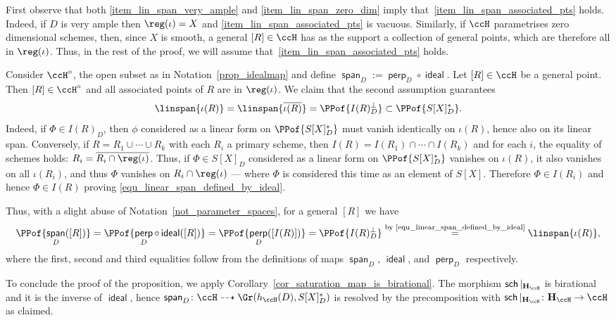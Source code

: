 \documentclass[12pt,a4paper]{article}
\DeclareMathOperator{\sch}{\mathsf {sch}}
\DeclareMathOperator{\spanmap}{\mathsf {span}}
\DeclareMathOperator{\idealmap}{\mathsf {ideal}}
\DeclareMathOperator{\perpmap}{\mathsf {perp}}
\begin{document}
\begin{prf}
  First observe that both \ref{item_lin_span_very_ample} and \ref{item_lin_span_zero_dim} imply
  that~\ref{item_lin_span_associated_pts} holds.
   Indeed,   if $D$ is very ample then $\reg(\iota)=X$
     and \ref{item_lin_span_associated_pts}     is vacuous.
     Similarly,     if $\ccH$ parametrises zero dimensional schemes, then, since $X$ is smooth,
     a general $[R]\in \ccH$ has as the support a collection of general points, which are therefore all in $\reg(\iota)$.
   Thus, in the rest of the proof, we will assume that~\ref{item_lin_span_associated_pts} holds.

   Consider $\ccH^{\circ}$, the open subset as in Notation~\ref{prop_idealmap} and define
   $\spanmap_D:= \perpmap_D \circ \idealmap$.
   Let $[R]\in \ccH$ be a general point. Then
   $[R]\in \ccH^{\circ}$ and all associated points of $R$ are in $\reg(\iota)$.
   We claim that the second assumption guarantees 
   \begin{equation}\label{equ_linear_span_defined_by_ideal}
      \linspan{\iota(R)}
     =\linspan{\overline{\iota(R)}}
     =\PPof{I(R)_D^{\perp}} \subset \PPof{S[X]_D^{*}}.
   \end{equation}
   Indeed, if $\Phi \in I(R)_D$, then $\phi$ considered as a linear form on $\PPof{S[X]_D^{*}}$  must
   vanish identically on $\iota(R)$, hence also on its linear span.
   Conversely, if $R= R_1 \cup \dotsb \cup R_k$ with each $R_i$ a primary scheme,
     then $I(R) =I(R_1)\cap \dotsb \cap I(R_k)$
     and for each $i$, the equality of schemes holds: $R_i=\overline{R_i\cap \reg(\iota)}$.
   Thus, if $\Phi \in S[X]_D$ considered as a linear form on $\PPof{S[X]_D^{*}}$ vanishes on $\iota(R)$,
    it also vanishes on all  $\iota(R_i)$, and thus $\Phi$ vanishes on $R_i\cap \reg(\iota)$
   ---  where $\Phi$ is  considered this time as  an element of $S[X]$.
   Therefore $\Phi \in I(R_i)$ and hence $\Phi \in I(R)$ proving \eqref{equ_linear_span_defined_by_ideal}.

   Thus, with a slight abuse of Notation~\ref{not_parameter_spaces},
   for a general $[R]$ we have
   \[
     \PPof{\spanmap_D([R])}= \PPof{\perpmap_D \circ \idealmap([R])} =
     \PPof{\perpmap_D([I(R)])} = \PPof{I(R)_D^\perp}
   \overset{ \text{by~\eqref{equ_linear_span_defined_by_ideal}}}{=}
     \linspan{\iota(R)},
   \]
   where the first, second and third equalities follow from the definitions of maps
   $\spanmap_D$, $\idealmap$, and $\perpmap_D$ respectively.

   To conclude the proof of the proposition,
   we apply Corollary~\ref{cor_saturation_map_is_birational}.
   The morphism $\sch|_{\mathbf{H}_{\ccH}}$
   is birational and it is the inverse of $\idealmap$,
   hence
   $\spanmap_D\colon \ccH \dashrightarrow \Gr(h_{\ccH}(D), S[X]_D^*)$
      is resolved by the precomposition with
      $\sch|_{\mathbf{H}_{\ccH}}\colon \mathbf{H}_{\ccH} \to \ccH$ as claimed.
\end{prf}
\end{document}
